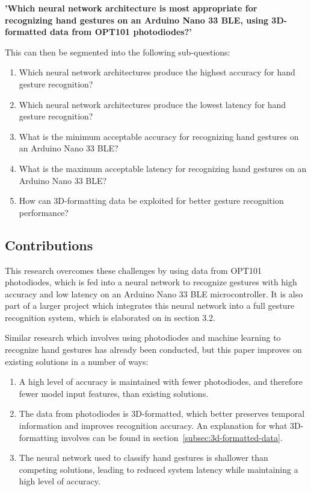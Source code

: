 \textbf{'Which neural network architecture is most appropriate for recognizing hand gestures on an Arduino Nano 33 BLE, using 3D-formatted data from OPT101 photodiodes?'}

This can then be segmented into the following sub-questions:
\begin{enumerate}
    \item Which neural network architectures produce the highest accuracy for hand gesture recognition?
    \item Which neural network architectures produce the lowest latency for hand gesture recognition?
    \item What is the minimum acceptable accuracy for recognizing hand gestures on an Arduino Nano 33 BLE?
    \item What is the maximum acceptable latency for recognizing hand gestures on an Arduino Nano 33 BLE?
    \item How can 3D-formatting data be exploited for better gesture recognition performance?
\end{enumerate}

\subsection{Contributions}\label{subsec:contributions}
This research overcomes these challenges by using data from OPT101 photodiodes, which is fed into a neural network to recognize gestures with high accuracy and low latency on an Arduino Nano 33 BLE microcontroller.
It is also part of a larger project which integrates this neural network into a full gesture recognition system, which is elaborated on in section 3.2.

Similar research which involves using photodiodes and machine learning to recognize hand gestures has already been conducted, but this paper improves on existing solutions in a number of ways:
\begin{enumerate}
    \item A high level of accuracy is maintained with fewer photodiodes, and therefore fewer model input features, than existing solutions.
    \item The data from photodiodes is 3D-formatted, which better preserves temporal information and improves recognition accuracy.
    An explanation for what 3D-formatting involves can be found in section~\ref{subsec:3d-formatted-data}.
    \item The neural network used to classify hand gestures is shallower than competing solutions, leading to reduced system latency while maintaining a high level of accuracy.
\end{enumerate}

